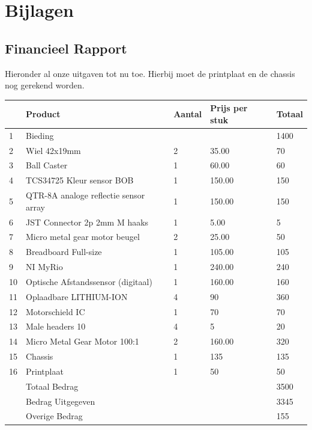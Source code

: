 \documentclass[kulak]{kulakarticle} %
\begin{document}
\section{Bijlagen}
\subsection{Financieel Rapport}
Hieronder al onze uitgaven tot nu toe. Hierbij moet de printplaat en de chassis nog gerekend worden. 
\begin{tabular}{  l | l | l | l | l }
	
	& Product & Aantal & Prijs per stuk & Totaal  \\ \hline
	1 & Bieding & & & 1400 \\ \hline
	2 & Wiel 42x19mm & 2 & 35.00 & 70 \\ \hline
	3 & Ball Caster & 1 & 60.00 & 60   \\ \hline
	4 & TCS34725 Kleur sensor BOB  & 1 & 150.00 & 150   \\ \hline
	5 & QTR-8A analoge reflectie sensor array & 1 & 150.00 & 150 \\ \hline
	6 & JST Connector 2p 2mm M haaks & 1 & 5.00 & 5 \\ \hline	
	7 & Micro metal gear motor beugel & 2 & 25.00 & 50 \\ \hline
	8 & Breadboard Full-size & 1 & 105.00 & 105   \\ \hline
	9 & NI MyRio & 1 & 240.00 & 240 \\ \hline
	10 & Optische Afstandssensor (digitaal) & 1 & 160.00 & 160  \\ \hline
	11 & Oplaadbare LITHIUM-ION & 4 & 90 & 360 \\ \hline
	12 & Motorschield IC & 1 & 70 & 70  \\ \hline
	13 & Male headers 10 & 4 & 5 & 20   \\ \hline
	14 & Micro Metal Gear Motor 100:1 & 2 & 160.00 & 320 \\ \hline
	15 & Chassis & 1 & 135 & 135 \\ \hline
	16 & Printplaat & 1 & 50 & 50 \\ \hline
	& Totaal Bedrag & & & 3500\\ 
	& Bedrag Uitgegeven & & & 3345 \\ 
	& Overige Bedrag & & & 155
	
\end{tabular}
\end{document}
